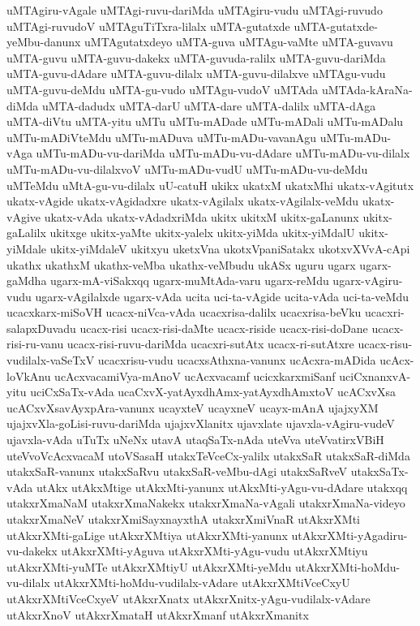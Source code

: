 {uMTAgiru-vAgale
uMTAgi-ruvu-dariMda
uMTAgiru-vudu
uMTAgi-ruvudo
uMTAgi-ruvudoV
uMTAguTiTxra-lilalx
uMTA-gutatxde
uMTA-gutatxde-yeMbu-danunx
uMTAgutatxdeyo
uMTA-guva
uMTAgu-vaMte
uMTA-guvavu
uMTA-guvu
uMTA-guvu-dakekx
uMTA-guvuda-ralilx
uMTA-guvu-dariMda
uMTA-guvu-dAdare
uMTA-guvu-dilalx
uMTA-guvu-dilalxve
uMTAgu-vudu
uMTA-guvu-deMdu
uMTA-gu-vudo
uMTAgu-vudoV
uMTAda
uMTAda-kAraNa-diMda
uMTA-dadudx
uMTA-darU
uMTA-dare
uMTA-dalilx
uMTA-dAga
uMTA-diVtu
uMTA-yitu
uMTu
uMTu-mADade
uMTu-mADali
uMTu-mADalu
uMTu-mADiVteMdu
uMTu-mADuva
uMTu-mADu-vavanAgu
uMTu-mADu-vAga
uMTu-mADu-vu-dariMda
uMTu-mADu-vu-dAdare
uMTu-mADu-vu-dilalx
uMTu-mADu-vu-dilalxvoV
uMTu-mADu-vudU
uMTu-mADu-vu-deMdu
uMTeMdu
uMtA-gu-vu-dilalx
uU-catuH
ukikx
ukatxM
ukatxMhi
ukatx-vAgitutx
ukatx-vAgide
ukatx-vAgidadxre
ukatx-vAgilalx
ukatx-vAgilalx-veMdu
ukatx-vAgive
ukatx-vAda
ukatx-vAdadxriMda
ukitx
ukitxM
ukitx-gaLanunx
ukitx-gaLalilx
ukitxge
ukitx-yaMte
ukitx-yalelx
ukitx-yiMda
ukitx-yiMdalU
ukitx-yiMdale
ukitx-yiMdaleV
ukitxyu
uketxVna
ukotxVpaniSatakx
ukotxvXVvA-cApi
ukathx
ukathxM
ukathx-veMba
ukathx-veMbudu
ukASx
uguru
ugarx
ugarx-gaMdha
ugarx-mA-viSakxqq
ugarx-muMtAda-varu
ugarx-reMdu
ugarx-vAgiru-vudu
ugarx-vAgilalxde
ugarx-vAda
ucita
uci-ta-vAgide
ucita-vAda
uci-ta-veMdu
ucacxkarx-miSoVH
ucacx-niVca-vAda
ucacxrisa-dalilx
ucacxrisa-beVku
ucacxri-salapxDuvadu
ucacx-risi
ucacx-risi-daMte
ucacx-riside
ucacx-risi-doDane
ucacx-risi-ru-vanu
ucacx-risi-ruvu-dariMda
ucacxri-sutAtx
ucacx-ri-sutAtxre
ucacx-risu-vudilalx-vaSeTxV
ucacxrisu-vudu
ucacxsAthxna-vanunx
ucAcxra-mADida
ucAcx-loVkAnu
ucAcxvacamiVya-mAnoV
ucAcxvacamf
ucicxkarxmiSanf
uciCxnanxvA-yitu
uciCxSaTx-vAda
ucaCxvX-yatAyxdhAmx-yatAyxdhAmxtoV
ucACxvXsa
ucACxvXsavAyxpAra-vanunx
ucayxteV
ucayxneV
ucayx-mAnA
ujajxyXM
ujajxvXla-goLisi-ruvu-dariMda
ujajxvXlanitx
ujavxlate
ujavxla-vAgiru-vudeV
ujavxla-vAda
uTuTx
uNeNx
utavA
utaqSaTx-nAda
uteVva
uteVvatirxVBiH
uteVvoVcAcxvacaM
utoVSasaH
utakxTeVceCx-yalilx
utakxSaR
utakxSaR-diMda
utakxSaR-vanunx
utakxSaRvu
utakxSaR-veMbu-dAgi
utakxSaRveV
utakxSaTx-vAda
utAkx
utAkxMtige
utAkxMti-yanunx
utAkxMti-yAgu-vu-dAdare
utakxqq
utakxrXmaNaM
utakxrXmaNakekx
utakxrXmaNa-vAgali
utakxrXmaNa-videyo
utakxrXmaNeV
utakxrXmiSayxnayxthA
utakxrXmiVnaR
utAkxrXMti
utAkxrXMti-gaLige
utAkxrXMtiya
utAkxrXMti-yanunx
utAkxrXMti-yAgadiru-vu-dakekx
utAkxrXMti-yAguva
utAkxrXMti-yAgu-vudu
utAkxrXMtiyu
utAkxrXMti-yuMTe
utAkxrXMtiyU
utAkxrXMti-yeMdu
utAkxrXMti-hoMdu-vu-dilalx
utAkxrXMti-hoMdu-vudilalx-vAdare
utAkxrXMtiVceCxyU
utAkxrXMtiVceCxyeV
utAkxrXnatx
utAkxrXnitx-yAgu-vudilalx-vAdare
utAkxrXnoV
utAkxrXmataH
utAkxrXmanf
utAkxrXmanitx
}

